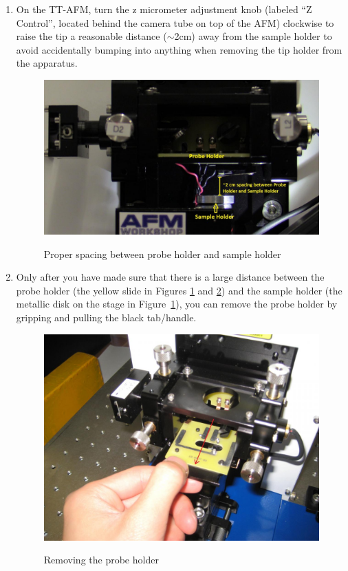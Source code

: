 \documentclass{../lab}
\begin{document}
\begin{enumerate}
    \item On the TT-AFM, turn the z micrometer adjustment knob (labeled ``Z Control'', located behind the camera tube on top of the AFM) clockwise to raise the tip a reasonable distance ($\sim$2cm) away from the sample holder to avoid accidentally bumping into anything when removing the tip holder from the apparatus.

    \begin{figure}[H]
        \centering
        \href{http://experimentationlab.berkeley.edu/sites/default/files/AFMImages/AFMstagespace_0.jpg}{\includegraphics[width=0.95\linewidth]{images/AFMstagespace_0.jpg}}
        \caption{Proper spacing between probe holder and sample holder}
        \label{fig:AFMStageSpace}
    \end{figure}
    
    \item Only after you have made sure that there is a large distance between the probe holder (the yellow slide in Figures \ref{fig:AFMStageSpace} and \ref{fig:PullOutYellowSlide}) and the sample holder (the metallic disk on the stage in Figure~\ref{fig:AFMStageSpace}), you can remove the probe holder by gripping and pulling the black tab/handle.

    \begin{figure}[H]
        \centering
        \href{http://experimentationlab.berkeley.edu/sites/default/files/AFMImages/14.JPG}{\includegraphics[width=0.71\linewidth]{images/14.JPG}}
        \caption{Removing the probe holder}
        \label{fig:PullOutYellowSlide}
    \end{figure}


\end{enumerate}
\end{document}
